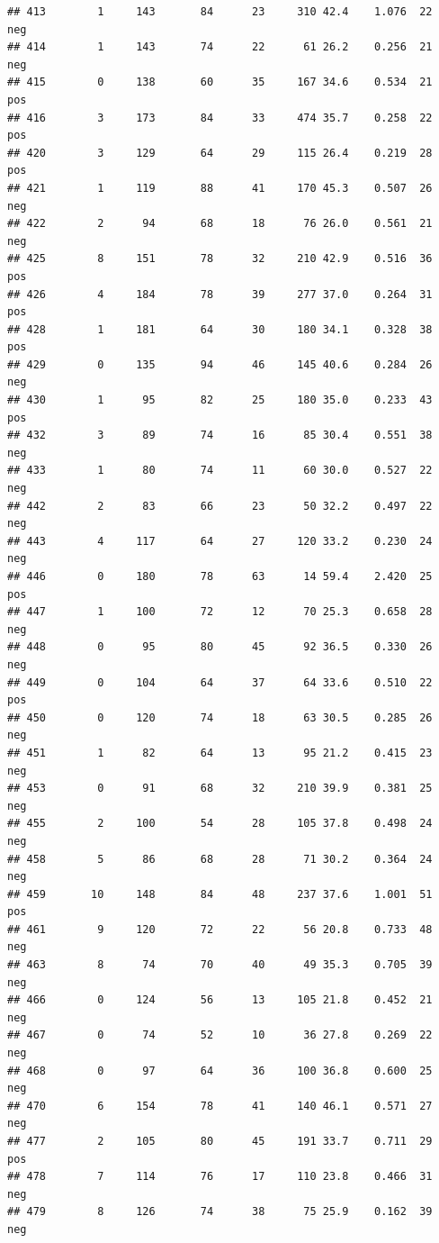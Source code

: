 \documentclass[
]{article}
\begin{document}
\begin{verbatim}
## 413        1     143       84      23     310 42.4    1.076  22      neg
## 414        1     143       74      22      61 26.2    0.256  21      neg
## 415        0     138       60      35     167 34.6    0.534  21      pos
## 416        3     173       84      33     474 35.7    0.258  22      pos
## 420        3     129       64      29     115 26.4    0.219  28      pos
## 421        1     119       88      41     170 45.3    0.507  26      neg
## 422        2      94       68      18      76 26.0    0.561  21      neg
## 425        8     151       78      32     210 42.9    0.516  36      pos
## 426        4     184       78      39     277 37.0    0.264  31      pos
## 428        1     181       64      30     180 34.1    0.328  38      pos
## 429        0     135       94      46     145 40.6    0.284  26      neg
## 430        1      95       82      25     180 35.0    0.233  43      pos
## 432        3      89       74      16      85 30.4    0.551  38      neg
## 433        1      80       74      11      60 30.0    0.527  22      neg
## 442        2      83       66      23      50 32.2    0.497  22      neg
## 443        4     117       64      27     120 33.2    0.230  24      neg
## 446        0     180       78      63      14 59.4    2.420  25      pos
## 447        1     100       72      12      70 25.3    0.658  28      neg
## 448        0      95       80      45      92 36.5    0.330  26      neg
## 449        0     104       64      37      64 33.6    0.510  22      pos
## 450        0     120       74      18      63 30.5    0.285  26      neg
## 451        1      82       64      13      95 21.2    0.415  23      neg
## 453        0      91       68      32     210 39.9    0.381  25      neg
## 455        2     100       54      28     105 37.8    0.498  24      neg
## 458        5      86       68      28      71 30.2    0.364  24      neg
## 459       10     148       84      48     237 37.6    1.001  51      pos
## 461        9     120       72      22      56 20.8    0.733  48      neg
## 463        8      74       70      40      49 35.3    0.705  39      neg
## 466        0     124       56      13     105 21.8    0.452  21      neg
## 467        0      74       52      10      36 27.8    0.269  22      neg
## 468        0      97       64      36     100 36.8    0.600  25      neg
## 470        6     154       78      41     140 46.1    0.571  27      neg
## 477        2     105       80      45     191 33.7    0.711  29      pos
## 478        7     114       76      17     110 23.8    0.466  31      neg
## 479        8     126       74      38      75 25.9    0.162  39      neg

\end{verbatim}
\end{document}
